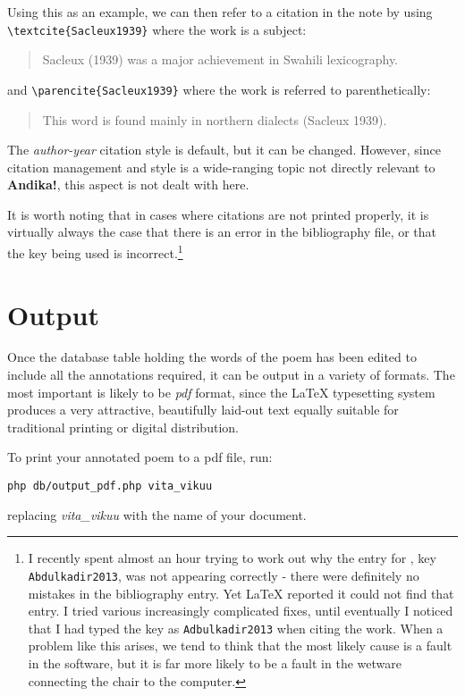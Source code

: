 Using this as an example, we can then refer to a citation in the note by using \verb|\textcite{Sacleux1939}| where the work is a subject:
\begin{quotation}
Sacleux (1939) was a major achievement in Swahili lexicography.
\end{quotation}
and \verb|\parencite{Sacleux1939}| where the work is referred to parenthetically:
\begin{quotation}
This word is found mainly in northern dialects (Sacleux 1939).
\end{quotation}

The \textit{author-year} citation style is default, but it can be changed.  However, since citation management and style is a wide-ranging topic not directly relevant to \textbf{Andika!}, this aspect is not dealt with here.

It is worth noting that in cases where citations are not printed properly, it is virtually always the case that there is an error in the bibliography file, or that the key being used is incorrect.\footnote{I recently spent almost an hour trying to work out why the entry for \citet{Abdulkadir2013}, key \texttt{Abdulkadir2013}, was not appearing correctly - there were definitely no mistakes in the bibliography entry.  Yet LaTeX reported it could not find that entry.  I tried various increasingly complicated fixes, until eventually I noticed that I had typed the key as \texttt{Adbulkadir2013} when citing the work.  When a problem like this arises, we tend to think that the most likely cause is a fault in the software, but it is far more likely to be a fault in the wetware connecting the chair to the computer.}


\section{Output}
\label{s:output}

Once the database table holding the words of the poem has been edited to include all the annotations required, it can be output in a variety of formats.  The most important is likely to be \textit{pdf} format, since the LaTeX typesetting system produces a very attractive, beautifully laid-out text equally suitable for traditional printing or digital distribution.

To print your annotated poem to a pdf file, run:

\verb|php db/output_pdf.php vita_vikuu|

replacing \textit{vita_vikuu} with the name of your document.


